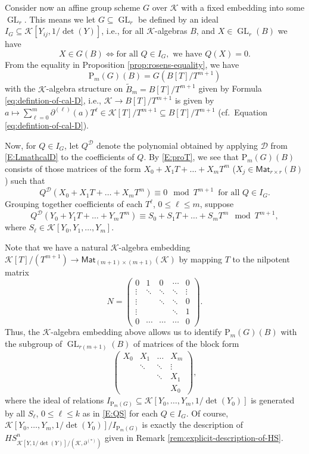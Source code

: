 \documentclass[10pt,a4paper]{amsart}
\theoremstyle{plain} %
\theoremstyle{definition}
\theoremstyle{remark}
\newcommand{\cK}{\mathcal{K}}   %
\newcommand{\rP}[1]{\mathrm{P}_{\!#1}}
\newcommand{\Mat}{\mathsf{Mat}}
\newcommand{\GL}{\operatorname{GL}}
\newcommand{\hde}[1]{\partial^{(#1)}}  %
\newcommand{\D}{\mathcal{D}} %
\numberwithin{equation}{subsection}
\begin{document}
Consider now an affine group scheme $G$ over $\cK$ with a fixed embedding into some $\GL_{r}$. This means we let $G\subseteq \GL_r$ be defined by an ideal $I_G\subseteq \cK[Y_{ij},1/\det(Y)] $, i.e., for all $\cK$-algebras $B$, and $X\in \GL_r(B)$ we have
\[ X\in G(B) \Longleftrightarrow \text{for all } Q\in I_G, \text{ we have } Q(X)=0. \]
From the equality in Proposition \ref{prop:rosens-equality}, we have
\begin{equation}\label{E:proT}
\rP{m}(G)(B)= G(B[T]/T^{m+1}) 
\end{equation}
with the $\cK$-algebra structure on $\tilde{B}_m=B[T]/T^{m+1}$ given by Formula \eqref{eq:defintion-of-cal-D}, i.e., $\cK \to B[T]/T^{m+1}$ is given by $a \mapsto \sum_{\ell=0}^m\partial^{(\ell)}(a)T^\ell\in \cK[T]/T^{m+1}\subseteq B[T]/T^{m+1}$ (cf.~Equation \eqref{eq:defintion-of-cal-D}). 

Now, for $Q \in I_G$, let $Q^{\D}$ denote the polynomial obtained by applying $\D$ from \eqref{E:LmathcalD} to the coefficients of $Q$. By \eqref{E:proT}, we see that $\rP{m}(G)(B)$ consists of those matrices of the form $X_0+X_1T+\ldots+X_mT^m$ ($X_j\in \Mat_{r\times r}(B)$) such that
\[ Q^\D(X_0+X_1T+\ldots+X_mT^m) \equiv 0 \mod T^{m+1}\, \text{ for all } Q\in I_G.
\]
Grouping together coefficients of each  $T^\ell$, $0 \leq \ell \leq m$, suppose
\begin{equation}\label{E:QS} 
Q^\D(Y_0+ Y_1T+ \dots+ Y_m T^m) \equiv  S_0 + S_1 T + \dots + S_m T^m \mod T^{m+1},
\end{equation}
where $S_\ell \in \cK[Y_0, Y_1, \dots, Y_m]$. 

Note that we have a natural $\cK$-algebra embedding $\cK[T]/(T^{m+1})\to \Mat_{(m+1)\times (m+1)}(\cK)$ by mapping $T$ to the nilpotent matrix 
		\[ N=  \begin{pmatrix}
 0 & 1 & 0 & \cdots & 0 \\ \vdots & \ddots & \ddots & \ddots & \vdots  \\ \vdots && \ddots & \ddots & 0 \\ \vdots && & \ddots & 1 \\
 0 &  \cdots &\cdots &\cdots & 0
\end{pmatrix}. \]
Thus, the $\cK$-algebra embedding above allows us to identify $\rP{m}(G)(B)$ with the subgroup of $\GL_{r(m+1)}(B)$ of matrices
	of the  block form
	\begin{equation}
    \begin{pmatrix}
			X_0 & X_1 & \dots&X_m \\
			&    \ddots     & \ddots&\vdots\\
			&&\ddots&X_1\\
			&&&X_0
		\end{pmatrix},
	\label{eq:block-matrix}
	\end{equation} 
	where the ideal of relations $I_{\rP{m}(G)}\subseteq \cK[Y_0,\ldots, Y_m,1/\det(Y_0)]$ is generated by all $S_\ell$, $0\leq \ell \leq k$ as in \eqref{E:QS} for each $Q \in I_G$. 
    Of course, $\cK[Y_0,\ldots, Y_m,1/\det(Y_0)]/I_{\rP{m}(G)}$ is exactly the description of $HS^n_{\cK[Y,1/\det(Y)]/(\cK,\hde{*})}$ given in Remark \ref{rem:explicit-description-of-HS}.
 
\end{document}
